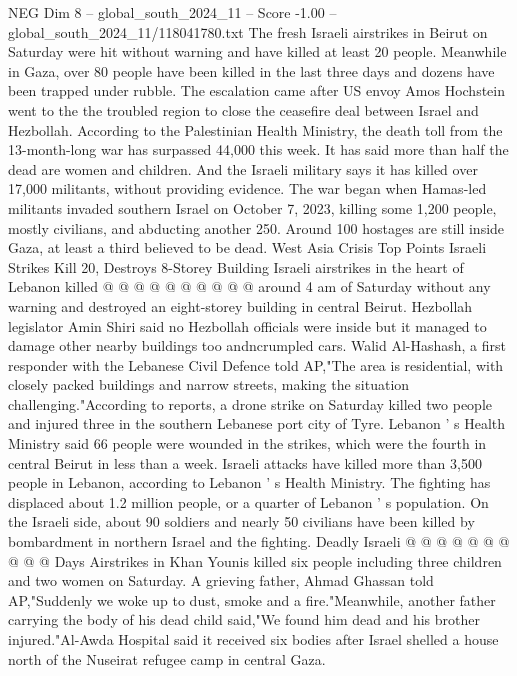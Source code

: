\begin{textsample}{NEG Dim 8 – global\_south\_2024\_11 – Score -1.00 – global\_south\_2024\_11/118041780.txt}  \label{ex:f8_neg_314}
The fresh Israeli airstrikes in Beirut on Saturday were hit without warning and have killed at least 20 people.
Meanwhile in Gaza, over 80 people have been killed in the last three days and dozens have been trapped under rubble.
The escalation came after US envoy Amos Hochstein went to the the troubled region to close the ceasefire deal between Israel and Hezbollah.
According to the Palestinian Health Ministry, the death toll from the 13-month-long war has surpassed 44,000 this week.
It has said more than half the dead are women and children.
And the Israeli military says it has killed over 17,000 militants, without providing evidence.
The war began when Hamas-led militants invaded southern Israel on October 7, 2023, killing some 1,200 people, mostly civilians, and abducting another 250.
Around 100 hostages are still inside Gaza, at least a third believed to be dead.
West Asia Crisis Top Points Israeli Strikes Kill 20, Destroys 8-Storey Building Israeli airstrikes in the heart of Lebanon killed @ @ @ @ @ @ @ @ @ @ around 4 am of Saturday without any warning and destroyed an eight-storey building in central Beirut.
Hezbollah legislator Amin Shiri said no Hezbollah officials were inside but it managed to damage other nearby buildings too andncrumpled cars.
Walid Al-Hashash, a first responder with the Lebanese Civil Defence told AP,"The area is residential, with closely packed buildings and narrow streets, making the situation challenging."According to reports, a drone strike on Saturday killed two people and injured three in the southern Lebanese port city of Tyre.
Lebanon ' s Health Ministry said 66 people were wounded in the strikes, which were the fourth in central Beirut in less than a week.
Israeli attacks have killed more than 3,500 people in Lebanon, according to Lebanon ' s Health Ministry.
The fighting has displaced about 1.2 million people, or a quarter of Lebanon ' s population.
On the Israeli side, about 90 soldiers and nearly 50 civilians have been killed by bombardment in northern Israel and the fighting.
Deadly Israeli @ @ @ @ @ @ @ @ @ @ Days Airstrikes in Khan Younis killed six people including three children and two women on Saturday.
A grieving father, Ahmad Ghassan told AP,"Suddenly we woke up to dust, smoke and a fire."Meanwhile, another father carrying the body of his dead child said,"We found him dead and his brother injured."Al-Awda Hospital said it received six bodies after Israel shelled a house north of the Nuseirat refugee camp in central Gaza.

\end{textsample}

